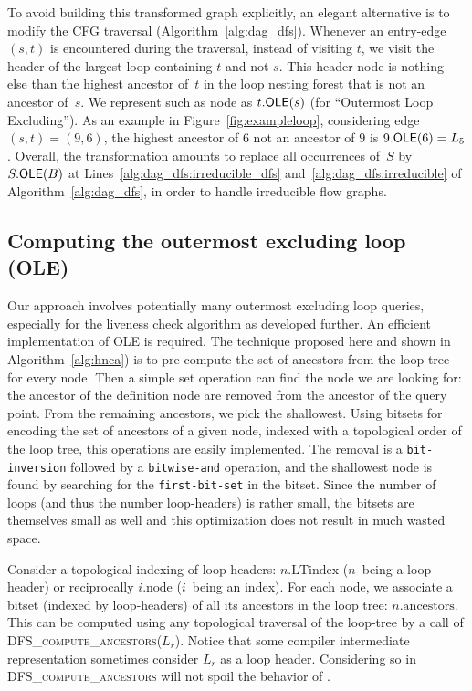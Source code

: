 To avoid building this transformed graph explicitly, an elegant alternative is to modify the CFG traversal (Algorithm~\ref{alg:dag_dfs}).
Whenever an entry-edge $(s,t)$ is encountered during the traversal, instead of visiting $t$, we visit the header of the largest loop containing $t$ and not $s$.
This header node is nothing else than the highest ancestor of~$t$ in the loop nesting forest that is not an ancestor of~$s$.
We represent such as node as $t.\textsf{OLE}(s)$ (for ``Outermost Loop Excluding'').
As an example in Figure~\ref{fig:exampleloop}, considering edge $(s,t)=(9,6)$, the highest ancestor of $6$ not an ancestor of $9$ is $9.\textsf{OLE}(6)=L_5$. 
Overall, the transformation amounts to replace all occurrences of~$S$ by $S.\textsf{OLE}(B)$ at Lines~\ref{alg:dag_dfs:irreducible_dfs} and~\ref{alg:dag_dfs:irreducible} of Algorithm~\ref{alg:dag_dfs}, in order to handle irreducible flow graphs.


\newcommand{\couple}[2]{\langle#1,#2\rangle}
\def\sep{,$ $}

\subsection{Computing the outermost excluding loop (OLE)}
\label{sec:ole}
Our approach involves potentially many outermost excluding loop queries, especially for the liveness check algorithm as developed further.
An efficient implementation of \textsf{OLE} is required.
The technique proposed here and shown in Algorithm~\ref{alg:hnca}) is to pre-compute the set of ancestors from the loop-tree for every node.
Then a simple set operation can find the node we are looking for:
the ancestor of the definition node are removed from the ancestor of the query point.
From the remaining ancestors, we pick the shallowest.
Using bitsets for encoding the set of ancestors of a given node, indexed with a topological order of the loop tree, this operations are easily implemented.
The removal is a \texttt{bit-inversion} followed by a \texttt{bitwise-and} operation, and the shallowest node is found by searching for the \texttt{first-bit-set} in the bitset.
Since the number of loops (and thus the number loop-headers) is rather small, the bitsets are themselves small as well and this optimization does not result in much wasted space.

Consider a topological indexing of loop-headers: $n.\textrm{LTindex}$ ($n$~being a loop-header) or reciprocally $i.\textrm{node}$ ($i$~being an index).
For each node, we associate a bitset (indexed by loop-headers) of all its ancestors in the loop tree:
$n.\textrm{ancestors}$.
This can be computed using any topological traversal of the loop-tree by a call of \textsc{DFS\_compute\_ancestors}($L_r$).
Notice that some compiler intermediate representation sometimes consider $L_r$ as a loop header.
Considering so in \textsc{DFS\_compute\_ancestors} will not spoil the behavior of \@OLE.

